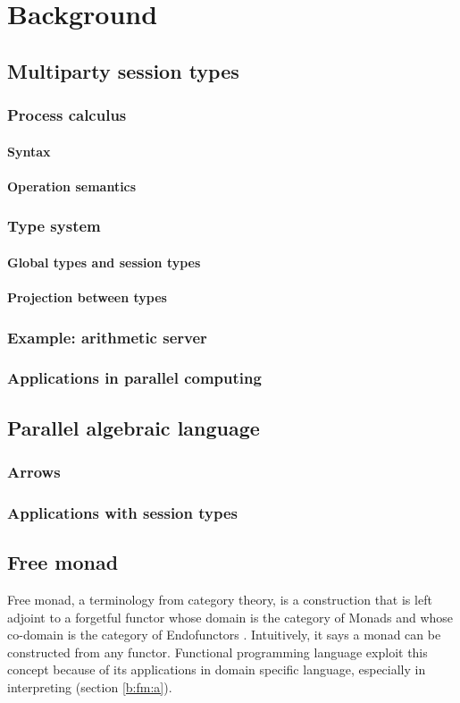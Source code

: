 \chapter{Background}
\section{Multiparty session types} 
\subsection{Process calculus}
\subsubsection{Syntax}
\subsubsection{Operation semantics}
\subsection{Type system}
\subsubsection{Global types and session types}
\subsubsection{Projection between types}
\subsection{Example: arithmetic server}
\subsection{Applications in parallel computing}
\section{Parallel algebraic language}
\subsection{Arrows}
\subsection{Applications with session types}
\section{Free monad}
Free monad, a terminology from category theory, is a construction that is left adjoint to a forgetful functor whose domain is the category of Monads and whose co-domain is the category of Endofunctors \cite{contributorsCatsFreeMonads}. Intuitively, it says a monad can be constructed from any functor. Functional programming language exploit this concept because of its applications in domain specific language, especially in interpreting (section \ref{b:fm:a}).
